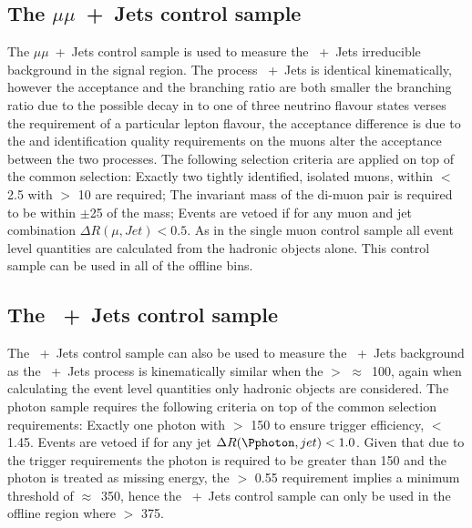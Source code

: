 \subsection{The $\mu\mu$~+~Jets control sample} %
\label{par:the_mumu_jets_control_sample}
The $\mu\mu$~+~Jets control sample is used to measure the 
\HepProcess{\PZ\to\nu\nu}~+~Jets irreducible background in the signal region. 
The process \HepProcess{\PZ\to\mu\mu}~+~Jets is identical kinematically, 
however the acceptance and the branching ratio are both smaller the branching 
ratio due to the possible decay in to one of three neutrino flavour states 
verses the requirement of a particular lepton flavour, the acceptance 
difference is due to the \PT and identification quality requirements on the 
muons alter the acceptance between the two processes. The following selection 
criteria are applied on top of the common selection: Exactly two tightly 
identified, isolated muons, within \mETA $<$ 2.5 with \PT $>$ \unit{10}{\GeV} 
are required; The invariant mass of the di-muon pair is required to be within 
$\pm$\unit{25}{\GeV} of the \PZ mass; Events are vetoed if for any muon and jet 
combination $\Delta R(\mu,Jet) < 0.5$. As in the single muon control sample all 
event level quantities are calculated from the hadronic objects alone. This 
control sample can be used in all of the offline \HT bins.

\subsection{The \Pphoton~+~Jets control sample} %
\label{par:the_pphoton_jets_control_sample}
The \Pphoton~+~Jets control sample can also be used to measure the 
\HepProcess{\PZ\to\nu\nu}~+~Jets background as the \Pphoton~+~Jets process is 
kinematically similar when the \Pphoton \ET $>$ 
$\approx$~\unit{100}{\GeV}\cite{PAS-SUS-08-002,Bern:2011pa}, again when 
calculating the event level quantities only hadronic objects are considered.
The photon sample requires the following criteria on top of the common 
selection requirements: Exactly one photon with \ET $>$ \unit{150}{\GeV} to 
ensure trigger efficiency, \mETA $<$ 1.45. Events are vetoed if for any jet 
$\Delta R(\Pphoton,jet) < 1.0$. Given that due to the trigger requirements the 
photon \ET is required to be greater than \unit{150}{\GeV} and the photon is 
treated as missing energy, the \alt $>$ 0.55 requirement implies a minimum \HT 
threshold of $\approx$~\unit{350}{\GeV}, hence the \Pphoton~+~Jets control 
sample can only be used in the offline region where \HT $>$ \unit{375}{\GeV}.

